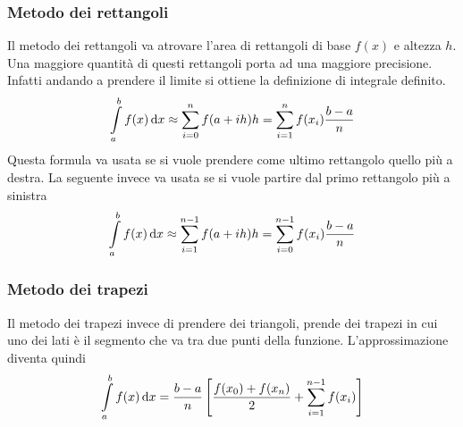 \subsubsection{Metodo dei rettangoli}
\begin{center}
\end{center}
Il metodo dei rettangoli va atrovare l'area di rettangoli di base $f(x)$ e altezza $h$. Una 
maggiore quantità di questi rettangoli porta ad una maggiore precisione. Infatti andando a prendere
il limite si ottiene la definizione di integrale definito.
\begin{equation*}
  \int\limits_{a}^{b} f(x)\mathop{}\!\mathrm{d} x \approx \sum\limits^{n}_{i=0} f(a+ih)h = \sum\limits^{n}_{i=1} f(x_i)
  \frac{b-a}{n}
\end{equation*}
Questa formula va usata se si vuole prendere come ultimo rettangolo quello più a destra. La 
seguente invece va usata se si vuole partire dal primo rettangolo più a sinistra
\begin{equation*}
  \int\limits_{a}^{b} f(x)\mathop{}\!\mathrm{d} x \approx \sum\limits^{n-1}_{i=1} f(a+ih)h = \sum\limits^{n-1}_{i=0} 
  f(x_i)\frac{b-a}{n}
\end{equation*}

\subsubsection{Metodo dei trapezi}
\begin{center}
\end{center}
Il metodo dei trapezi invece di prendere dei triangoli, prende dei trapezi in cui uno dei lati è
il segmento che va  tra due punti della funzione. L'approssimazione diventa quindi
\begin{equation*}
  \int\limits_{a}^{b} f(x)\mathop{}\!\mathrm{d} x = \frac{b-a}{n}\left[ \frac{f(x_0)+f(x_n)}{2}+
  \sum\limits^{n-1}_{i=1} f(x_i) \right]
\end{equation*}
